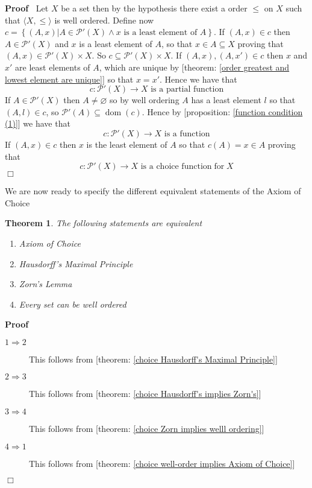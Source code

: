 \documentclass{book}
\newcommand{\tmop}[1]{\ensuremath{\operatorname{#1}}}
\newenvironment{proof}{\noindent\textbf{Proof\ }}{\hspace*{\fill}$\Box$\medskip}
\newtheorem{theorem}{Theorem}
\begin{document}
\begin{proof}
  Let $X$ be a set then by the hypothesis there exist a order $\leqslant$ on
  $X$ such that $\langle X, \leqslant \rangle$ is well ordered. Define now $c
  = \left\{ (A, x) |A \in \mathcal{P}' (X) \wedge x \text{ is a least element
  of $A$} \right\}$. If $(A, x) \in c$ then $A \in \mathcal{P}' (X)$ and $x$
  is a least element of $A$, so that $x \in A \subseteq X$ proving that $(A,
  x) \in \mathcal{P}' (X) \times X$. So $c \subseteq \mathcal{P}' (X) \times
  X$. If $(A, x), (A, x') \in c$ then $x$ and $x'$ are least elements of $A$,
  which are unique by [theorem: \ref{order greatest and lowest element are
  unique}] so that $x = x'$. Hence we have that
  \[ c : \mathcal{P}' (X) \rightarrow X \text{ is a partial function} \]
  If $A \in \mathcal{P}' (X)$ then $A \neq \varnothing$ so by well ordering
  $A$ has a least element $l$ so that $(A, l) \in c$, so $\mathcal{P}' (A)
  \subseteq \tmop{dom} (c)$. Hence by [proposition: \ref{function condition
  (1)}] we have that
  \[ c : \mathcal{P}' (X) \rightarrow X \text{ is a function} \]
  If $(A, x) \in c$ then $x$ is the least element of $A$ so that $c (A) = x
  \in A$ proving that
  \[ c : \mathcal{P}' (X) \rightarrow X \text{ is a choice function}
     \tmop{for} X \]
\end{proof}

We are now ready to specify the different equivalent statements of the Axiom
of Choice

\begin{theorem}
  The following statements are equivalent
  \begin{enumerate}
    \item Axiom of Choice
    
    \item Hausdorff's Maximal Principle
    
    \item Zorn's Lemma
    
    \item Every set can be well ordered
  \end{enumerate}
\end{theorem}

\begin{proof}
  
  \begin{description}
    \item[$1 \Rightarrow 2$] This follows from [theorem: \ref{choice
    Hausdorff's Maximal Principle}]
    
    \item[$2 \Rightarrow 3$] This follows from [theorem: \ref{choice
    Hausdorff's implies Zorn's}]
    
    \item[$3 \Rightarrow 4$] This follows from [theorem: \ref{choice Zorn
    implies welll ordering}]
    
    \item[$4 \Rightarrow 1$] This follows from [theorem: \ref{choice
    well-order implies Axiom of Choice}]
  \end{description}
\end{proof}
\end{document}
